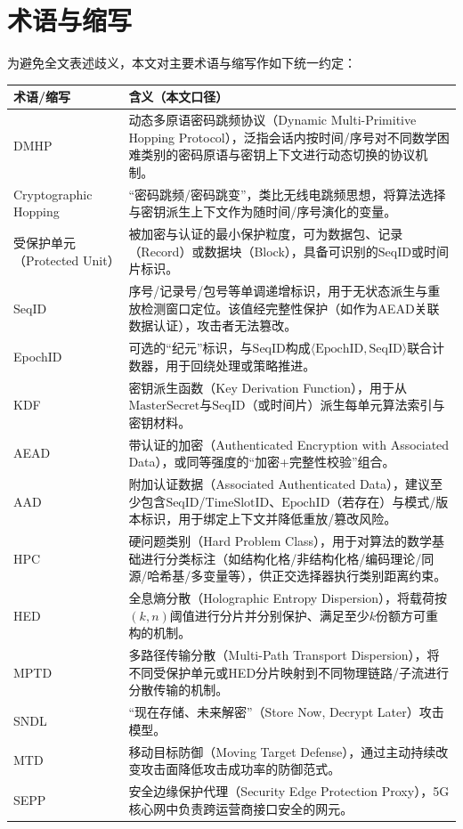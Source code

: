\documentclass[12pt,a4paper]{article}
\begin{document}
\section{术语与缩写}

为避免全文表述歧义，本文对主要术语与缩写作如下统一约定：

\renewcommand{\arraystretch}{1.4}
\begin{longtable}{|p{3.2cm}|p{12.0cm}|}
\hline
\textbf{术语/缩写} & \textbf{含义（本文口径）} \\
\hline
DMHP & 动态多原语密码跳频协议（Dynamic Multi-Primitive Hopping Protocol），泛指会话内按时间/序号对不同数学困难类别的密码原语与密钥上下文进行动态切换的协议机制。\\
\hline
Cryptographic Hopping & “密码跳频/密码跳变”，类比无线电跳频思想，将算法选择与密钥派生上下文作为随时间/序号演化的变量。\\
\hline
受保护单元（Protected Unit） & 被加密与认证的最小保护粒度，可为数据包、记录（Record）或数据块（Block），具备可识别的$\text{SeqID}$或时间片标识。\\
\hline
SeqID & 序号/记录号/包号等单调递增标识，用于无状态派生与重放检测窗口定位。该值经完整性保护（如作为AEAD关联数据认证），攻击者无法篡改。\\
\hline
EpochID & 可选的“纪元”标识，与$\text{SeqID}$构成$\langle\text{EpochID},\text{SeqID}\rangle$联合计数器，用于回绕处理或策略推进。\\
\hline
KDF & 密钥派生函数（Key Derivation Function），用于从$\text{MasterSecret}$与$\text{SeqID}$（或时间片）派生每单元算法索引与密钥材料。\\
\hline
AEAD & 带认证的加密（Authenticated Encryption with Associated Data），或同等强度的“加密+完整性校验”组合。\\
\hline
AAD & 附加认证数据（Associated Authenticated Data），建议至少包含$\text{SeqID}$/$\text{TimeSlotID}$、$\text{EpochID}$（若存在）与模式/版本标识，用于绑定上下文并降低重放/篡改风险。\\
\hline
HPC & 硬问题类别（Hard Problem Class），用于对算法的数学基础进行分类标注（如结构化格/非结构化格/编码理论/同源/哈希基/多变量等），供正交选择器执行类别距离约束。\\
\hline
HED & 全息熵分散（Holographic Entropy Dispersion），将载荷按$(k,n)$阈值进行分片并分别保护、满足至少$k$份额方可重构的机制。\\
\hline
MPTD & 多路径传输分散（Multi-Path Transport Dispersion），将不同受保护单元或HED分片映射到不同物理链路/子流进行分散传输的机制。\\
\hline
SNDL & ``现在存储、未来解密''（Store Now, Decrypt Later）攻击模型。\\
\hline
MTD & 移动目标防御（Moving Target Defense），通过主动持续改变攻击面降低攻击成功率的防御范式。\\
\hline
SEPP & 安全边缘保护代理（Security Edge Protection Proxy），5G核心网中负责跨运营商接口安全的网元。\\
\hline
\end{longtable}
\end{document}
